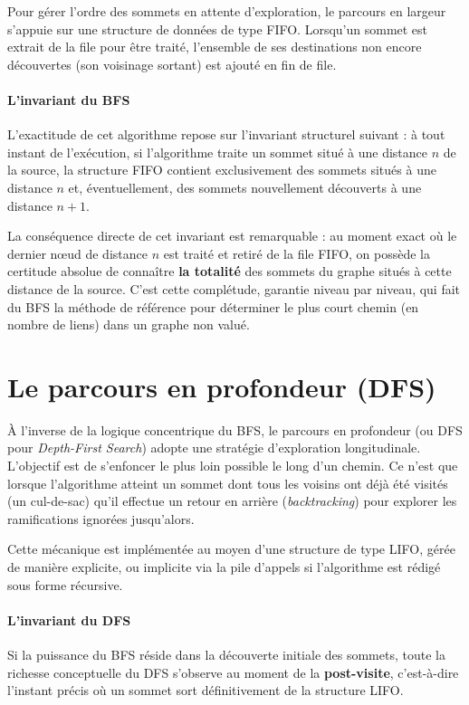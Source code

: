 \documentclass[11pt,a4paper]{report}
\begin{document}
	Pour gérer l'ordre des sommets en attente d'exploration, le parcours en largeur s'appuie sur une structure de données de type FIFO. Lorsqu'un sommet est extrait de la file pour être traité, l'ensemble de ses destinations non encore découvertes (son voisinage sortant) est ajouté en fin de file.
	
	\paragraph{L'invariant du BFS}
	L'exactitude de cet algorithme repose sur l'invariant structurel suivant : à tout instant de l'exécution, si l'algorithme traite un sommet situé à une distance $n$ de la source, la structure FIFO contient exclusivement des sommets situés à une distance $n$ et, éventuellement, des sommets nouvellement découverts à une distance $n+1$.
	
	La conséquence directe de cet invariant est remarquable : au moment exact où le dernier nœud de distance $n$ est traité et retiré de la file FIFO, on possède la certitude absolue de connaître \textbf{la totalité} des sommets du graphe situés à cette distance de la source. C'est cette complétude, garantie niveau par niveau, qui fait du BFS la méthode de référence pour déterminer le plus court chemin (en nombre de liens) dans un graphe non valué.
	
	\section{Le parcours en profondeur (DFS)}
	
	À l'inverse de la logique concentrique du BFS, le parcours en profondeur (ou DFS pour \textit{Depth-First Search}) adopte une stratégie d'exploration longitudinale. L'objectif est de s'enfoncer le plus loin possible le long d'un chemin. Ce n'est que lorsque l'algorithme atteint un sommet dont tous les voisins ont déjà été visités (un \og{}cul-de-sac\fg{}) qu'il effectue un retour en arrière (\textit{backtracking}) pour explorer les ramifications ignorées jusqu'alors.
	
	Cette mécanique est implémentée au moyen d'une structure de type LIFO, gérée de manière explicite, ou implicite via la pile d'appels si l'algorithme est rédigé sous forme récursive. 
	
	\paragraph{L'invariant du DFS}
	Si la puissance du BFS réside dans la découverte initiale des sommets, toute la richesse conceptuelle du DFS s'observe au moment de la \textbf{post-visite}, c'est-à-dire l'instant précis où un sommet sort définitivement de la structure LIFO.
	
\end{document}
